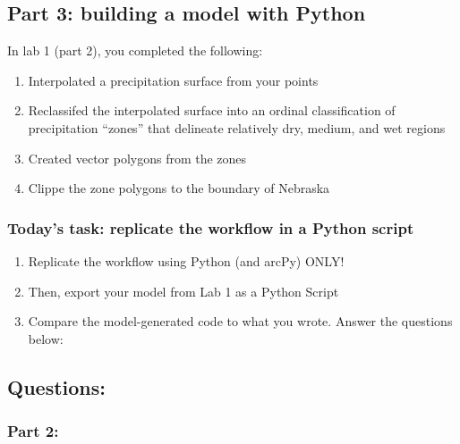 \documentclass[
]{article}
\providecommand{\tightlist}{%
  \setlength{\itemsep}{0pt}\setlength{\parskip}{0pt}}
\begin{document}
\newpage

\hypertarget{part-3-building-a-model-with-python}{%
\subsection{Part 3: building a model with
Python}\label{part-3-building-a-model-with-python}}

In lab 1 (part 2), you completed the following:

\begin{enumerate}
\def\labelenumi{\arabic{enumi}.}
\tightlist
\item
  Interpolated a precipitation surface from your points
\item
  Reclassifed the interpolated surface into an ordinal classification of
  precipitation ``zones'' that delineate relatively dry, medium, and wet
  regions
\item
  Created vector polygons from the zones
\item
  Clippe the zone polygons to the boundary of Nebraska
\end{enumerate}

\hypertarget{todays-task-replicate-the-workflow-in-a-python-script}{%
\subsubsection{Today's task: replicate the workflow in a Python
script}\label{todays-task-replicate-the-workflow-in-a-python-script}}

\begin{enumerate}
\def\labelenumi{\arabic{enumi}.}
\tightlist
\item
  Replicate the workflow using Python (and arcPy) ONLY!
\item
  Then, export your model from Lab 1 as a Python Script
\item
  Compare the model-generated code to what you wrote. Answer the
  questions below:
\end{enumerate}

\newpage

\hypertarget{questions}{%
\subsection{Questions:}\label{questions}}

\hypertarget{part-2}{%
\subsubsection{Part 2:}\label{part-2}}
\end{document}
